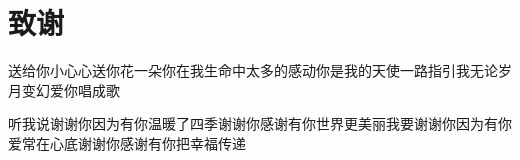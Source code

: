\section*{\heiti{}致\qquad 谢}

送给你小心心送你花一朵你在我生命中太多的感动你是我的天使一路指引我无论岁月变幻爱你唱成歌

听我说谢谢你因为有你温暖了四季谢谢你感谢有你世界更美丽我要谢谢你因为有你爱常在心底谢谢你感谢有你把幸福传递
